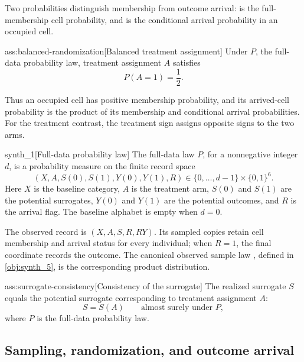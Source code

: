 \documentclass[11pt]{article}
\begin{document}
Two probabilities distinguish membership from outcome arrival:  is the full-membership cell probability, and  is the conditional arrival probability in an occupied cell.

\begin{assumptionv}{ass:balanced-randomization}[Balanced treatment assignment]
Under \(P\), the full-data probability law, treatment assignment \(A\) satisfies
\[
P(A=1)=\frac12.
\]
\end{assumptionv}

Thus an occupied cell has positive membership probability, and its arrived-cell probability is the product of its membership and conditional arrival probabilities. For the treatment contrast, the treatment sign  assigns opposite signs to the two arms.

\begin{definitionv}{synth_1}[Full-data probability law]
The full-data law \(P\), for a nonnegative integer \(d\), is a probability measure on the finite record space
\[
(X,A,S(0),S(1),Y(0),Y(1),R)
\in \{0,\ldots,d-1\}\times\{0,1\}^{6}.
\]
Here \(X\) is the baseline category, \(A\) is the treatment arm, \(S(0)\) and \(S(1)\) are the potential surrogates, \(Y(0)\) and \(Y(1)\) are the potential outcomes, and \(R\) is the arrival flag. The baseline alphabet is empty when \(d=0\).
\end{definitionv}

The observed record  is \((X,A,S,R,RY)\). Its sampled copies  retain cell membership and arrival status for every individual; when \(R=1\), the final coordinate records the outcome. The canonical observed sample law , defined in \cref{obj:synth_5}, is the corresponding product distribution.

\begin{assumptionv}{ass:surrogate-consistency}[Consistency of the surrogate]
The realized surrogate \(S\) equals the potential surrogate corresponding to treatment assignment \(A\):
\[
S=S(A)\qquad\text{almost surely under }P,
\]
where \(P\) is the full-data probability law.
\end{assumptionv}

\subsection{Sampling, randomization, and outcome arrival}
\end{document}
